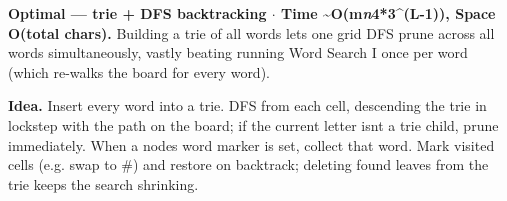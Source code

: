 \documentclass[11pt]{article}
\begin{document}
\textbf{Optimal --- trie + DFS backtracking \(\cdot\) Time \textasciitilde O(m\emph{n}4*3\^{}(L-1)), Space O(total chars).} Building a trie of all words lets one grid DFS prune across all words simultaneously, vastly beating running Word Search I once per word (which re-walks the board for every word).

\textbf{Idea.} Insert every word into a trie. DFS from each cell, descending the trie in lockstep with the path on the board; if the current letter isn\textquotesingle t a trie child, prune immediately. When a node\textquotesingle s word marker is set, collect that word. Mark visited cells (e.g. swap to \textquotesingle\#\textquotesingle) and restore on backtrack; deleting found leaves from the trie keeps the search shrinking.

\end{document}
